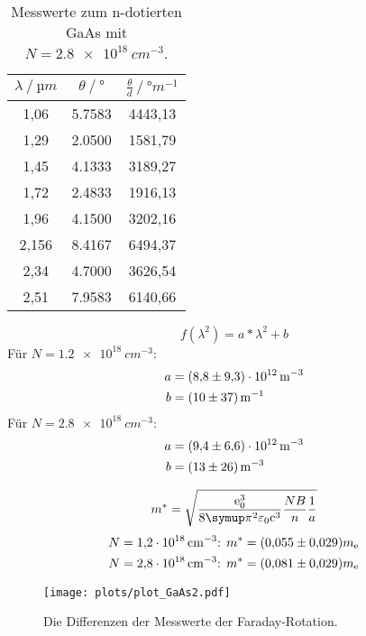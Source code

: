 \begin{table}
  \centering
  \caption{Messwerte zum n-dotierten GaAs mit $N = \SI{2.8e18}{cm^{-3}}$.}
  \label{tab:rein}
  \begin{tabular}{S[table-format=1.3] S[table-format=2.4] S[table-format=4.2]}
    \toprule
    {$\lambda\:/\:\si{µm}$} & {$\theta\:/\:\si{\degree}$} & {$\frac{\theta}{d}\:/\:\si{\degree m^{-1}}$} \\
    ,06  & 5.7583 & 4443,13 \\
    1,29  & 2.0500 & 1581,79 \\
    1,45  & 4.1333 & 3189,27 \\
    1,72  & 2.4833 & 1916,13 \\
    1,96  & 4.1500 & 3202,16 \\
    2,156 & 8.4167 & 6494,37 \\
    2,34  & 4.7000 & 3626,54 \\
    2,51  & 7.9583 & 6140,66 \\
    \bottomrule
  \end{tabular}
\end{table}

\begin{equation}
  f(\lambda^2) = a*\lambda^2 + b
\end{equation}
Für $N = \SI{1.2e18}{cm^{-3}}$:
\begin{align*}
  a &= \SI{8.8\pm9.3e12}{m^{-3}} \\
  b &= \SI{10\pm37}{m^{-1}}
\end{align*}
Für $N = \SI{2.8e18}{cm^{-3}}$:
\begin{align*}
  a &= \SI{9.4\pm6.6e12}{m^{-3}} \\
  b &= \SI{13\pm26}{m^{-3}}
\end{align*}

\begin{equation}
  m^* = \sqrt{\frac{\text{e}_0^3}{8\pii^2\varepsilon_0\text{c}^3}\frac{NB}{n}\frac{1}{a}}
\end{equation}
\cite{n_GaAs}
\begin{align*}
  N = \SI{1.2e18}{cm^{-3}} &\text{: } m^*= (\num{0.055\pm0.029})m_\text{e} \\
  N = \SI{2.8e18}{cm^{-3}} &\text{: } m^*= (\num{0.081\pm0.029})m_\text{e}
\end{align*}


\begin{figure}
  \centering
  \texttt{[image: plots/plot\_GaAs2.pdf]}
  \caption{Die Differenzen der Messwerte der Faraday-Rotation.}
  \label{fig:GaAs2}
\end{figure}

